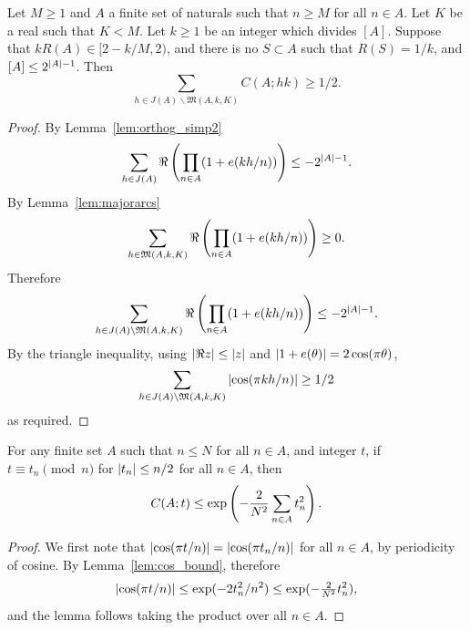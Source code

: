 \begin{lemma}\label{lem:minor_lbound}
  \leanok
Let $M\geq 1$ and $A$ a finite set of naturals such that $n\geq M$ for all $n\in A$. Let $K$ be a real such that $K<M$. Let $k\geq 1$ be an integer which divides $[A]$. Suppose that $kR(A) \in [2-k/M,2)$, and there is no $S\subset A$ such that $R(S)=1/k$, and $[A]\leq 2^{\left\lvert A\right\rvert-1}$. Then
\[\sum_{h\in J(A)\backslash \mathfrak{M}(A,k,K)} C(A;hk)\geq 1/2.\]
\end{lemma}
\begin{proof}
  \leanok
{}
By Lemma~\ref{lem:orthog_simp2}
\[\sum_{h\in J(A)}\Re\left( \prod_{n\in A}(1+e(kh/n))\right)\leq -2^{\left\lvert A\right\rvert-1}.\]
By Lemma~\ref{lem:majorarcs}
\[\sum_{h\in \mathfrak{M}(A,k,K)}\Re\left( \prod_{n\in A}(1+e(kh/n))\right) \geq 0.\]
Therefore
\[\sum_{h\in J(A)\backslash \mathfrak{M}(A,k,K)}\Re\left( \prod_{n\in A}(1+e(kh/n))\right)\leq -2^{\left\lvert A\right\rvert-1}.\]
By the triangle inequality, using $\left\lvert \Re z\right\rvert\leq \left\lvert z\right\rvert$ and $\left\lvert 1+e(\theta)\right\rvert=2\cos(\pi \theta)$,
\[\sum_{h\in J(A)\backslash \mathfrak{M}(A,k,K)}\left\lvert \cos(\pi kh/n)\right\rvert \geq 1/2\]
as required.
\end{proof}

\begin{lemma}\label{lem:cos_prod_bound}
  \leanok
For any finite set $A$ such that $n\leq N$ for all $n\in A$, and integer $t$, if $t\equiv t_n\pmod{n}$ for $\left\lvert t_n\right\rvert\leq n/2$ for all $n\in A$, then
\[C(A;t)\leq \exp\left( -\frac{2}{N^2}\sum_{n\in A}t_n^2\right).\]
\end{lemma}
\begin{proof}
  \leanok
{}
We first note that $\left\lvert \cos(\pi t/n)\right\rvert=\left\lvert \cos(\pi t_n/n)\right\rvert$ for all $n\in A$, by periodicity of cosine. By Lemma~\ref{lem:cos_bound}, therefore
\[\left\lvert \cos(\pi t/n)\right\rvert\leq \exp(-2t_n^2/n^2)\leq \exp(-\tfrac{2}{N^2}t_n^2),\]
and the lemma follows taking the product over all $n\in A$.
\end{proof}



